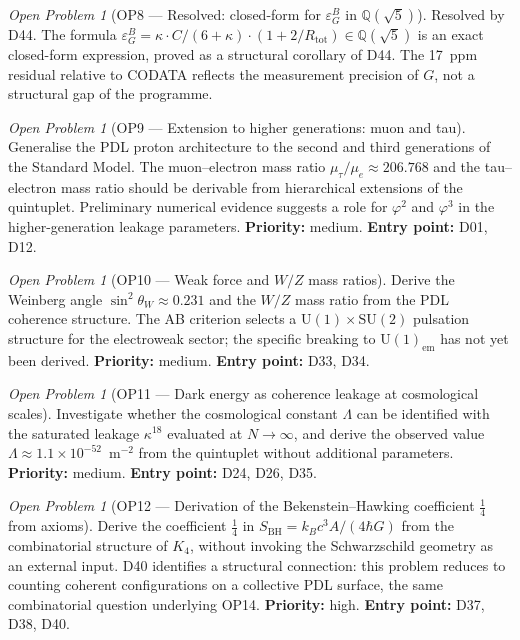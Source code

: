 \documentclass[11pt,a4paper]{article}
\theoremstyle{plain}
\theoremstyle{definition}
\theoremstyle{remark}
\newtheorem{openproblem}[theorem]{Open Problem}
\newcommand{\Rtot}{R_{\mathrm{tot}}}
\newcommand{\SBH}{S_{\mathrm{BH}}}
\newcommand{\epsGeomB}{\varepsilon_G^B}
\begin{document}
\begin{openproblem}[OP8 --- Resolved: closed-form for $\epsGeomB$ in $\mathbb{Q}(\sqrt{5})$]
\label{op:epsGeomB}
\textcolor{proofblue}{Resolved by D44.} The formula $\epsGeomB = \kappa \cdot C/(6+\kappa)\cdot(1+2/\Rtot) \in \mathbb{Q}(\sqrt{5})$ is an exact closed-form expression, proved as a structural corollary of D44. The 17~ppm residual relative to CODATA reflects the measurement precision of $G$, not a structural gap of the programme.
\end{openproblem}

\begin{openproblem}[OP9 --- Extension to higher generations: muon and tau]
\label{op:generations}
Generalise the PDL proton architecture to the second and third generations of the Standard Model. The muon--electron mass ratio $\mu_\tau/\mu_e\approx 206.768$ and the tau--electron mass ratio should be derivable from hierarchical extensions of the quintuplet. Preliminary numerical evidence suggests a role for $\varphi^2$ and $\varphi^3$ in the higher-generation leakage parameters. \textbf{Priority:} medium. \textbf{Entry point:} D01, D12.
\end{openproblem}

\begin{openproblem}[OP10 --- Weak force and $W/Z$ mass ratios]
\label{op:weak}
Derive the Weinberg angle $\sin^2\theta_W\approx 0.231$ and the $W/Z$ mass ratio from the PDL coherence structure. The AB criterion selects a $\mathrm{U}(1)\times\mathrm{SU}(2)$ pulsation structure for the electroweak sector; the specific breaking to $\mathrm{U}(1)_{\mathrm{em}}$ has not yet been derived. \textbf{Priority:} medium. \textbf{Entry point:} D33, D34.
\end{openproblem}

\begin{openproblem}[OP11 --- Dark energy as coherence leakage at cosmological scales]
\label{op:darkenergy}
Investigate whether the cosmological constant $\Lambda$ can be identified with the saturated leakage $\kappa^{18}$ evaluated at $N\to\infty$, and derive the observed value $\Lambda\approx 1.1\times10^{-52}$~m$^{-2}$ from the quintuplet without additional parameters. \textbf{Priority:} medium. \textbf{Entry point:} D24, D26, D35.
\end{openproblem}

\begin{openproblem}[OP12 --- Derivation of the Bekenstein--Hawking coefficient $\tfrac{1}{4}$ from axioms]
\label{op:BHcoeff}
Derive the coefficient $\tfrac{1}{4}$ in $\SBH=k_Bc^3A/(4\hbar G)$ from the combinatorial structure of $K_4$, without invoking the Schwarzschild geometry as an external input. D40 identifies a structural connection: this problem reduces to counting coherent configurations on a collective PDL surface, the same combinatorial question underlying OP14. \textbf{Priority:} high. \textbf{Entry point:} D37, D38, D40.
\end{openproblem}
\end{document}
